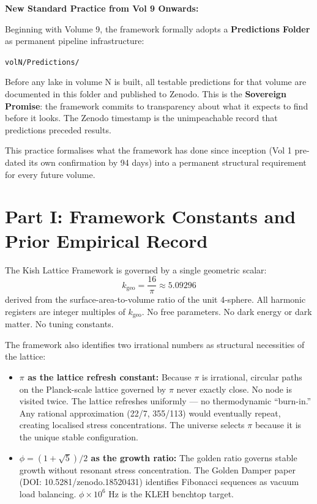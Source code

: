 \documentclass[12pt, letterpaper]{article}
\begin{document}
\bigskip

\begin{newpracticebox}
\textbf{New Standard Practice from Vol 9 Onwards:}

Beginning with Volume 9, the framework formally adopts a \textbf{Predictions
Folder} as permanent pipeline infrastructure:

\medskip
\texttt{volN/Predictions/}

\medskip
Before any lake in volume N is built, all testable predictions for that
volume are documented in this folder and published to Zenodo. This is the
\textbf{Sovereign Promise}: the framework commits to transparency about what
it expects to find before it looks. The Zenodo timestamp is the unimpeachable
record that predictions preceded results.

\medskip
This practice formalises what the framework has done since inception (Vol 1
pre-dated its own confirmation by 94 days) into a permanent structural
requirement for every future volume.
\end{newpracticebox}

\newpage

\section*{Part I: Framework Constants and Prior Empirical Record}

The Kish Lattice Framework is governed by a single geometric scalar:
\[
k_\mathrm{geo} = \frac{16}{\pi} \approx 5.09296
\]
derived from the surface-area-to-volume ratio of the unit 4-sphere. All
harmonic registers are integer multiples of $k_\mathrm{geo}$. No free
parameters. No dark energy or dark matter. No tuning constants.

\medskip
The framework also identifies two irrational numbers as structural
necessities of the lattice:

\begin{itemize}
\item \textbf{$\pi$ as the lattice refresh constant:} Because $\pi$ is
  irrational, circular paths on the Planck-scale lattice governed by $\pi$
  never exactly close. No node is visited twice. The lattice refreshes
  uniformly — no thermodynamic ``burn-in.'' Any rational approximation
  (22/7, 355/113) would eventually repeat, creating localised stress
  concentrations. The universe selects $\pi$ because it is the unique
  stable configuration.

\item \textbf{$\phi = (1+\sqrt{5})/2$ as the growth ratio:} The golden
  ratio governs stable growth without resonant stress concentration. The
  Golden Damper paper (DOI: 10.5281/zenodo.18520431) identifies Fibonacci
  sequences as vacuum load balancing. $\phi \times 10^6$ Hz is the KLEH
  benchtop target.
\end{itemize}
\end{document}
